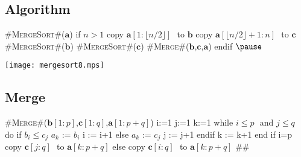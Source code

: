 
\begin{slide}
\section[2]{Algorithm}

\begin{minipage}{10cm}
  \begin{pseudo}
#\textsc{MergeSort}#($\bm{a}$)
{
  if $n>1$
    copy $\bm{a}[1:\lfloor n/2 \rfloor]\,\,$ to $\bm{b}$
    copy $\bm{a}[\lfloor n/2 \rfloor+1:n]\,\,$ to $\bm{c}$
    #\textsc{MergeSort}#($\bm{b}$)
    #\textsc{MergeSort}#($\bm{c}$)
    #\textsc{Merge}#($\bm{b}$,$\bm{c}$,$\bm{a}$)
  endif
} $\pause$
  \end{pseudo}
\end{minipage}\hfil
\begin{minipage}{12cm}
  \texttt{[image: mergesort8.mps]}
\end{minipage}
\end{slide}


\begin{slide}
\section[-2]{Merge}
\pausebuild
\begin{minipage}{10cm}
  \begin{pseudo}
#\textsc{Merge}#($\bm{b}[1:p]$,$\bm{c}[1:q]$,$\bm{a}[1:p+q]$)
{
  i:=1
  j:=1
  k:=1
  while $i \leq p\,\,$ and $j\leq q\,\,$ do
    if $b_i \leq c_j$
      $a_k$ := $b_i$
      i := i+1
    else
      $a_k$ := $c_j$
      j := j+1
    endif
    k := k+1
  end
  if i=p
    copy $\bm{c}[j:q]\,\,$ to $\bm{a}[k:p+q]$
  else
    copy $\bm{c}[i:q]\,\,$ to $\bm{a}[k:p+q]$
} #\pauseh#
  \end{pseudo}
\end{minipage}\hfil
\begin{minipage}{12cm}
  \pause
\end{minipage}
\end{slide}


